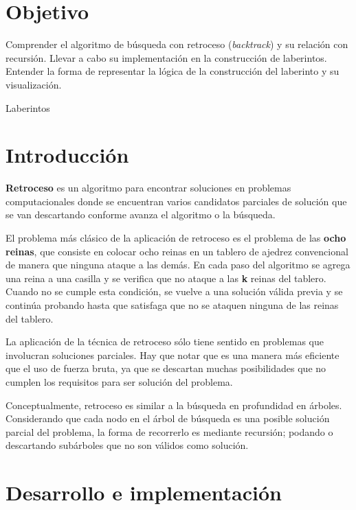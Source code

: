 

\section{Objetivo}
Comprender el algoritmo de búsqueda con retroceso (\textit{backtrack}) y su relación con recursión. Llevar a cabo su implementación en la construcción de laberintos. Entender la forma de representar la lógica de la construcción del laberinto y su visualización. \par


\begin{auxcode}
 \caption{Laberintos}
 \centering
\end{auxcode}

\section{Introducci\'on}
\textbf{Retroceso} es un algoritmo para encontrar soluciones en problemas computacionales donde se encuentran varios candidatos parciales de solución que se van descartando conforme avanza el algoritmo o la búsqueda.

El problema más clásico de la aplicación de retroceso es el problema de las \textbf{ocho reinas}, que consiste en colocar ocho reinas en un tablero de ajedrez convencional de manera que ninguna ataque a las demás. En cada paso del algoritmo se agrega una reina a una casilla y se verifica que no ataque a las \textbf{k} reinas del tablero. Cuando no se cumple esta condición, se vuelve a una solución válida previa y se continúa probando hasta que satisfaga que no se ataquen ninguna de las reinas del tablero.\par

La aplicación de la técnica de retroceso sólo tiene sentido en problemas que involucran soluciones parciales. Hay que notar que es una manera más eficiente que el uso de fuerza bruta, ya que se descartan muchas posibilidades que no cumplen los requisitos para ser solución del problema.

Conceptualmente, retroceso es similar a la búsqueda en profundidad en árboles. Considerando que cada nodo en el árbol de búsqueda es una posible solución parcial del problema, la forma de recorrerlo es mediante recursión; podando o descartando subárboles que no son válidos como solución.\par


\section{Desarrollo e implementaci\'on}

